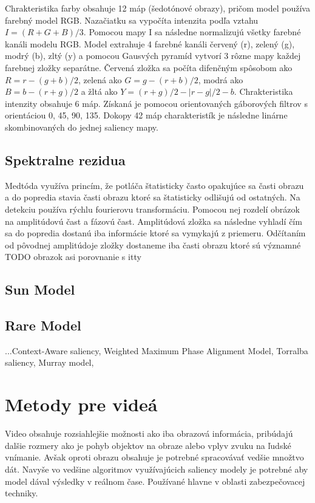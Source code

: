 Chrakteristika farby obsahuje 12 máp (šedotónové obrazy), pričom model používa farebný model RGB. Nazačiatku sa vypočíta intenzita podľa vztahu \begin{math} I = (R+G+B)/3\end{math}. Pomocou mapy I sa následne normalizujú všetky farebné kanáli modelu RGB. Model extrahuje 4 farebné kanáli červený (r), zelený (g), modrý (b), zltý (y) a pomocou Gausvých pyramíd vytvorí 3 rôzne mapy každej farebnej zložky separátne. Červená zložka sa počíta difenčným spôsobom ako \begin{math} R = r - (g + b)/2 \end{math}, zelená ako \begin{math} G = g - (r + b)/2 \end{math}, modrá ako \begin{math}B = b - (r + g)/2\end{math} a žltá ako \begin{math}Y = (r + g)/2 - |r - g|/2 - b\end{math}. Chrakteristika intenzity obsahuje 6 máp. Získaná je pomocou orientovaných gáborových filtrov s orientáciou 0\degree, 45\degree, 90\degree, 135\degree. Dokopy 42 máp charakteristík je následne linárne skombinovaných do jednej saliency mapy\cite{itty-98}.


\subsection{Spektralne rezidua}
Medtóda využíva princím, že potláča štatisticky často opakujúce sa časti obrazu a do popredia stavia časti obrazu ktoré sa štatisticky odlišujú od ostatných. Na detekciu používa rýchlu fourierovu transformáciu. Pomocou nej rozdelí obrázok na amplitúdovú čast a fázovú čast. Amplitúdová zložka sa následne vyhladí čím sa do popredia dostanú iba informácie ktoré sa vymykajú z priemeru. Odčítaním od pôvodnej amplitúdoje zložky dostaneme iba časti obrazu ktoré sú významné \cite{spectral-rezidual}
TODO obrazok asi porovnanie s itty
\subsection{Sun Model}
\subsection{Rare Model}
...Context-Aware saliency, Weighted Maximum Phase Alignment Model, Torralba saliency, Murray model,
\section{Metody pre videá}
Video obsahuje rozsiahlejšie možnosti ako iba obrazová informácia, pribúdajú dalšie rozmery ako je pohyb objektov na obraze alebo vplyv zvuku na ľudské vnímanie. Avšak oproti obrazu obsahuje je potrebné spracovávať vedšie množtvo
dát. Navyše vo vedšine algoritmov využívajúcich saliency modely je potrebné aby model dával výsledky v reálnom čase. Používané hlavne v oblasti zabezpečovacej techniky.
